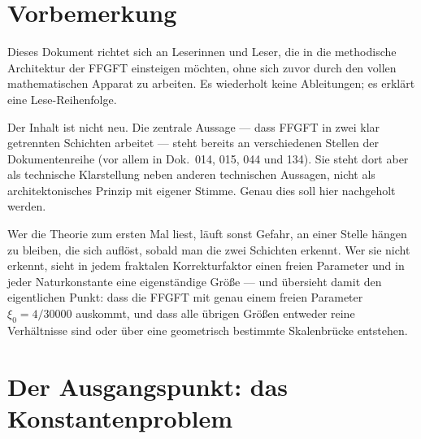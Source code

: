 
\section*{Vorbemerkung}

Dieses Dokument richtet sich an Leserinnen und Leser, die in die methodische
Architektur der FFGFT einsteigen möchten, ohne sich zuvor durch den vollen
mathematischen Apparat zu arbeiten. Es wiederholt keine Ableitungen; es
erklärt eine Lese-Reihenfolge.

Der Inhalt ist nicht neu. Die zentrale Aussage --- dass FFGFT in zwei klar
getrennten Schichten arbeitet --- steht bereits an verschiedenen Stellen
der Dokumentenreihe (vor allem in Dok.~014, 015, 044 und 134). Sie steht
dort aber als technische Klarstellung neben anderen technischen Aussagen,
nicht als architektonisches Prinzip mit eigener Stimme. Genau dies soll
hier nachgeholt werden.

Wer die Theorie zum ersten Mal liest, läuft sonst Gefahr, an einer Stelle
hängen zu bleiben, die sich auflöst, sobald man die zwei Schichten erkennt.
Wer sie nicht erkennt, sieht in jedem fraktalen Korrekturfaktor einen freien
Parameter und in jeder Naturkonstante eine eigenständige Größe --- und
übersieht damit den eigentlichen Punkt: dass die FFGFT mit genau einem
freien Parameter $\xi_0 = 4/30000$ auskommt, und dass alle übrigen Größen
entweder reine Verhältnisse sind oder über eine geometrisch bestimmte
Skalenbrücke entstehen.

\section{Der Ausgangspunkt: das Konstantenproblem}


